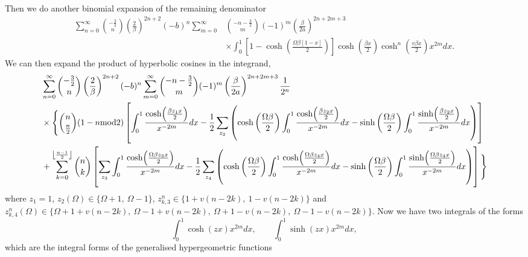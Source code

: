 Then we do another binomial expansion of the remaining denominator
\begin{equation}
    \begin{aligned}
        \sum_{n = 0}^\infty \binom{-\frac{3}{2}}{n} \left( \frac{2}{\beta}\right)^{2n+2} (-b)^n \sum_{m = 0}^\infty &\binom{-n-\frac{3}{2}}{m} (-1)^m \left( \frac{\beta}{2a}\right)^{2n + 2m + 3} \\
        &\times \int_0^1 \left[1 - \cosh\left(\frac{\Omega\beta[1-x]}{2}\right)\right]\cosh\left(\frac{\beta x}{2}\right)\cosh^n\left(\frac{v\beta x}{2}\right) x^{2m} dx.
    \end{aligned}
\end{equation}
We can then expand the product of hyperbolic cosines in the integrand,
\begin{equation}\label{eqn:bla}
    \begin{aligned}
        &\sum_{n = 0}^\infty \binom{-\frac{3}{2}}{n} \left( \frac{2}{\beta}\right)^{2n+2} (-b)^n \sum_{m = 0}^\infty \binom{-n-\frac{3}{2}}{m} (-1)^m \left( \frac{\beta}{2a}\right)^{2n + 2m + 3} \frac{1}{2^n}  \\
        &\times \Bigg\{\binom{n}{\frac{n}{2}}(1 - n \textrm{mod} 2) \left[ \int_0^1 \frac{\cosh(\frac{\beta z_1 x}{2})}{x^{-2m}} dx - \frac{1}{2} \sum_{z_2} \left( \cosh\left(\frac{\Omega\beta}{2}\right) \int_0^1 \frac{\cosh(\frac{\beta z_2 x }{2})}{x^{-2m}} dx - \sinh\left(\frac{\Omega\beta}{2}\right) \int_0^1 \frac{\sinh(\frac{\beta z_2 x}{2})}{x^{-2m}} dx \right) \right] \\
        &+ \sum_{k=0}^{\floor*{\frac{n-1}{2}}} \binom{n}{k} \left[ \sum_{z_3} \int_0^1 \frac{\cosh(\frac{\Omega\beta z_{3} x}{2})}{x^{-2m}}dx - \frac{1}{2} \sum_{z_4} \left( \cosh\left(\frac{\Omega\beta}{2}\right) \int^1_0 \frac{\cosh(\frac{\Omega\beta z_{4} x}{2})}{x^{-2m}} dx - \sinh\left(\frac{\Omega\beta}{2}\right) \int^1_0 \frac{\sinh(\frac{\Omega\beta z_{4} x}{2})}{x^{-2m}} dx \right) \right] \Bigg\}
    \end{aligned}
\end{equation}
where $z_1 = 1$, $z_2(\Omega) \in \{ \Omega + 1,\ \Omega - 1 \}$, $z_{k,3}^n \in \{ 1 + v(n - 2k),\ 1 - v(n - 2k) \}$ and $z_{k,4}^n(\Omega) \in \{ \Omega + 1 + v(n - 2k),\ \Omega - 1 + v(n - 2k),\ \Omega + 1 - v(n - 2k),\ \Omega - 1 - v(n - 2k) \}$. 
Now we have two integrals of the forms
\begin{equation}
    \int_0^1 \cosh(zx) x^{2m} dx, \qquad \int^1_0\sinh(zx) x^{2m} dx,
\end{equation}
which are the integral forms of the generalised hypergeometric functions
